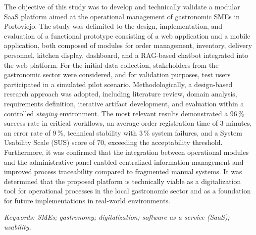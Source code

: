     \vspace{0.3cm}
    \raggedright
    The objective of this study was to develop and technically validate a modular SaaS platform aimed at the operational management of gastronomic SMEs in Portoviejo. The study was delimited to the design, implementation, and evaluation of a functional prototype consisting of a web application and a mobile application, both composed of modules for order management, inventory, delivery personnel, kitchen display, dashboard, and a RAG-based chatbot integrated into the web platform. For the initial data collection, stakeholders from the gastronomic sector were considered, and for validation purposes, test users participated in a simulated pilot scenario. Methodologically, a design-based research approach was adopted, including literature review, domain analysis, requirements definition, iterative artifact development, and evaluation within a controlled \textit{staging} environment. The most relevant results demonstrated a 96\,\% success rate in critical workflows, an average order registration time of 3 minutes, an error rate of 9\,\%, technical stability with 3\,\% system failures, and a System Usability Scale (SUS) score of 70, exceeding the acceptability threshold. Furthermore, it was confirmed that the integration between operational modules and the administrative panel enabled centralized information management and improved process traceability compared to fragmented manual systems. It was determined that the proposed platform is technically viable as a digitalization tool for operational processes in the local gastronomic sector and as a foundation for future implementations in real-world environments.

    \vspace{0.3cm}
    \textit{Keywords: SMEs; gastronomy; digitalization; software as a service (SaaS); usability.}

\clearpage
